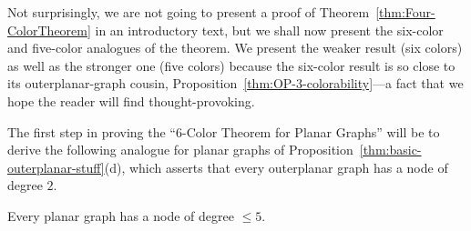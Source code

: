 Not surprisingly, we are not going to present a proof of
Theorem~\ref{thm:Four-ColorTheorem} in an introductory text, but we
shall now present the six-color and five-color analogues of the
theorem.  We present the weaker result (six colors) as well as the
stronger one (five colors) because the six-color result is so close to
its outerplanar-graph cousin,
Proposition~\ref{thm:OP-3-colorability}---a fact that we hope the
reader will find thought-provoking.

The first step in proving the ``$6$-Color Theorem for Planar Graphs''
will be to derive the following analogue for planar graphs of
Proposition~\ref{thm:basic-outerplanar-stuff}(d), which asserts that
every outerplanar graph has a node of degree $2$.

\begin{lemma}
\label{thm:PlanarGraph-degree5}
Every planar graph has a node of degree $\leq 5$.
\end{lemma}

